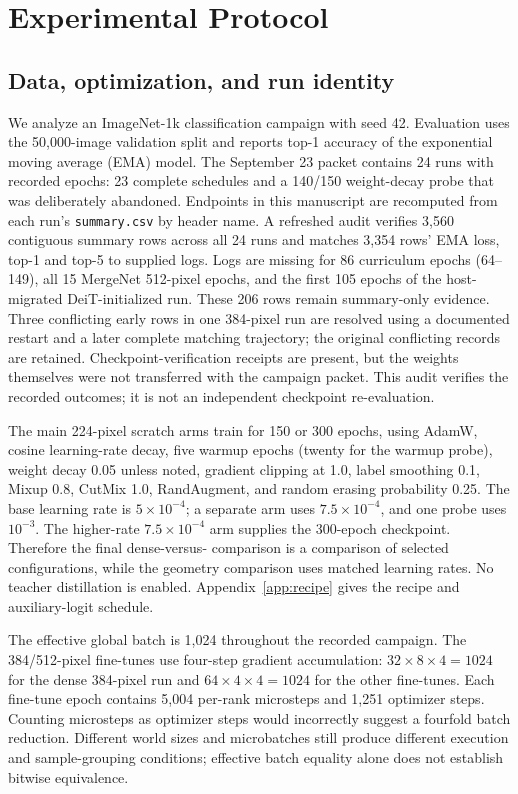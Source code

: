 \section{Experimental Protocol}
\label{sec:setup}

\subsection{Data, optimization, and run identity}

We analyze an ImageNet-1k classification campaign with seed 42. Evaluation
uses the 50,000-image validation split and reports top-1 accuracy of the
exponential moving average (EMA) model. The September 23 packet contains 24
runs with recorded epochs: 23 complete schedules and a 140/150 weight-decay
probe that was deliberately abandoned. Endpoints in this manuscript are
recomputed from each run's \texttt{summary.csv} by header name. A refreshed
audit verifies 3,560 contiguous summary rows across all 24 runs and matches
3,354 rows' EMA loss, top-1 and top-5 to supplied logs. Logs are missing for
86 curriculum epochs (64--149), all 15 MergeNet 512-pixel epochs, and the first
105 epochs of the host-migrated DeiT-initialized run. These 206 rows remain
summary-only evidence. Three conflicting early rows in one 384-pixel run
are resolved using a documented restart and a later complete matching
trajectory; the original conflicting records are retained. Checkpoint-verification
receipts are present, but the weights themselves were not transferred with
the campaign packet. This audit verifies the recorded outcomes; it is not an
independent checkpoint re-evaluation.

The main 224-pixel scratch arms train for 150 or 300 epochs, using AdamW,
cosine learning-rate decay, five warmup epochs (twenty for the warmup probe),
weight decay 0.05 unless noted, gradient
clipping at 1.0, label smoothing 0.1, Mixup 0.8, CutMix 1.0, RandAugment, and
random erasing probability 0.25. The base learning rate is $5\times10^{-4}$;
a separate \mn{} arm uses $7.5\times10^{-4}$, and one probe uses $10^{-3}$.
The higher-rate $7.5\times10^{-4}$ arm supplies
the 300-epoch \mn{} checkpoint. Therefore the final dense-versus-\mn{}
comparison is a comparison of selected configurations, while the geometry
comparison uses matched learning rates. No teacher distillation is enabled.
Appendix~\ref{app:recipe} gives the recipe and auxiliary-logit schedule.

The effective global batch is 1,024 throughout the recorded campaign. The
384/512-pixel fine-tunes use four-step gradient accumulation:
$32\times8\times4=1024$ for the dense 384-pixel run and
$64\times4\times4=1024$ for the other fine-tunes. Each fine-tune epoch contains
5,004 per-rank microsteps and 1,251 optimizer steps. Counting microsteps as
optimizer steps would incorrectly suggest a fourfold batch reduction.
Different world sizes and microbatches still produce different execution
and sample-grouping conditions; effective batch equality alone does not
establish bitwise equivalence.

